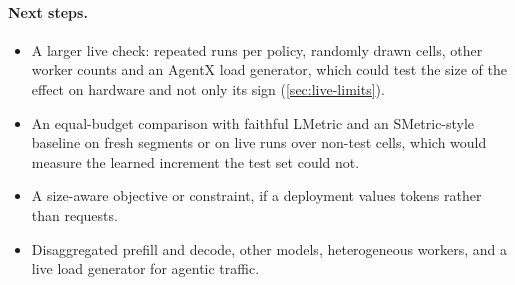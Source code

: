 \paragraph{Next steps.}
\begin{itemize}
  \item A larger live check: repeated runs per policy, randomly drawn cells, other worker counts and
    an AgentX load generator, which could test the size of the effect on hardware and not only its
    sign (\cref{sec:live-limits}).
  \item An equal-budget comparison with faithful LMetric and an SMetric-style baseline on fresh
    segments or on live runs over non-test cells, which would measure the learned increment the test
    set could not.
  \item A size-aware objective or constraint, if a deployment values tokens rather than requests.
  \item Disaggregated prefill and decode, other models, heterogeneous workers, and a live load
    generator for agentic traffic.
\end{itemize}
